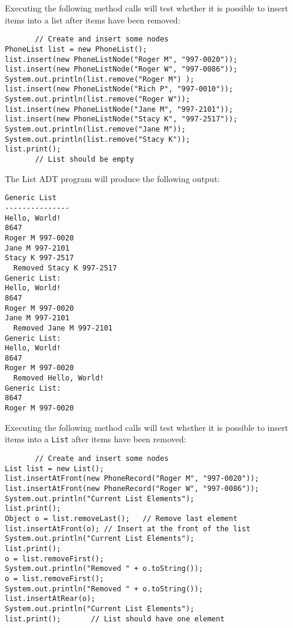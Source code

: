 \begin{ANS}
\item  Executing the following method calls will test
whether it is possible to insert items into a
list after items have been removed:

\begin{jjjlisting}
\begin{lstlisting}
       // Create and insert some nodes
PhoneList list = new PhoneList();
list.insert(new PhoneListNode("Roger M", "997-0020"));
list.insert(new PhoneListNode("Roger W", "997-0086"));
System.out.println(list.remove("Roger M") );
list.insert(new PhoneListNode("Rich P", "997-0010"));
System.out.println(list.remove("Roger W"));
list.insert(new PhoneListNode("Jane M", "997-2101"));
list.insert(new PhoneListNode("Stacy K", "997-2517"));
System.out.println(list.remove("Jane M"));
System.out.println(list.remove("Stacy K"));
list.print();
       // List should be empty
\end{lstlisting}
\end{jjjlisting}

\item  The  List ADT program will produce the
following output:

\begin{jjjlisting}
\begin{lstlisting}
Generic List
---------------
Hello, World!
8647
Roger M 997-0020
Jane M 997-2101
Stacy K 997-2517
  Removed Stacy K 997-2517
Generic List:
Hello, World!
8647
Roger M 997-0020
Jane M 997-2101
  Removed Jane M 997-2101
Generic List:
Hello, World!
8647
Roger M 997-0020
  Removed Hello, World!
Generic List:
8647
Roger M 997-0020

\end{lstlisting}
\end{jjjlisting}

\item  Executing the following method calls will test
whether it is possible to insert items into a
  {\tt List} after items have been removed:

\begin{jjjlisting}
\begin{lstlisting}
       // Create and insert some nodes
List list = new List();
list.insertAtFront(new PhoneRecord("Roger M", "997-0020"));
list.insertAtFront(new PhoneRecord("Roger W", "997-0086"));
System.out.println("Current List Elements");
list.print();
Object o = list.removeLast();   // Remove last element
list.insertAtFront(o); // Insert at the front of the list
System.out.println("Current List Elements");
list.print();
o = list.removeFirst();
System.out.println("Removed " + o.toString());
o = list.removeFirst();
System.out.println("Removed " + o.toString());
list.insertAtRear(o);
System.out.println("Current List Elements");
list.print();       // List should have one element
\end{lstlisting}
\end{jjjlisting}


\end{ANS}
